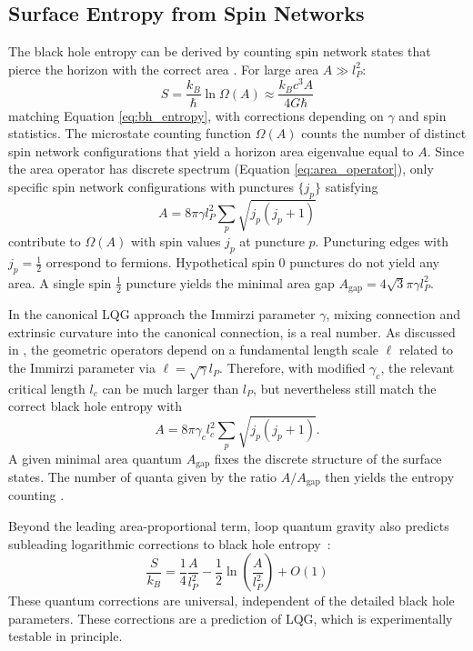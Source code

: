 \documentclass[11pt,a4paper]{article}
\theoremstyle{definition}
\begin{document}
	
	\subsection{Surface Entropy from Spin Networks}
	
	The black hole entropy can be derived by counting spin network states that pierce the horizon with the correct area \cite{rovelli1996,ashtekar1997}. For large area $A \gg l_P^2$:
	\begin{equation}
		S = \frac{k_B}{\hbar} \ln \Omega(A) \approx \frac{k_B c^3 A}{4G\hbar}
		\label{eq:lqg_entropy}
	\end{equation}
	matching Equation \eqref{eq:bh_entropy}, with corrections depending on $\gamma$ and spin statistics.
	The microstate counting function $\Omega(A)$ counts the number of distinct spin network configurations that yield a horizon area eigenvalue equal to $A$. Since the area operator has discrete spectrum (Equation \eqref{eq:area_operator}), only specific spin network configurations with punctures $\{j_p\}$ satisfying
	\begin{equation}
		A = 8\pi \gamma l_P^2 \sum_{p} \sqrt{j_p(j_p+1)}
	\end{equation}
	contribute to $\Omega(A)$ with spin values $j_p$ at puncture $p$.
	Puncturing edges with $j_p=\frac{1}{2}$ orrespond to fermions.
	Hypothetical spin $0$ punctures do not yield any area. 
	A single spin $\frac{1}{2}$  puncture yields the minimal area gap 
	$A_{\text{gap}}=4\sqrt{3}\pi \gamma l_P^2 $.   
	
	In the canonical LQG approach the Immirzi parameter $\gamma$, mixing connection and extrinsic curvature into the canonical connection, is a real number. As discussed in \cite{rainer1999length}, the geometric operators depend on a fundamental length scale $\ell$ related to the Immirzi parameter via $\ell = \sqrt{\gamma} l_P$. Therefore, with modified $\gamma_c$, the relevant critical length $l_c$ can be much larger than $l_P$, but nevertheless
	still match the correct black hole entropy with
	\begin{equation}
		A = 8\pi \gamma_c l_c^2 \sum_{p} \sqrt{j_p(j_p+1)} .
		\label{eq:area_discrete}
	\end{equation}
	A given minimal area quantum
	$A_{\text{gap}}$
	fixes the discrete structure of the surface states. The number of quanta given by the ratio $A/A_{\text{gap}}$ then yields the entropy counting \cite{rainer1999length}.
	
	Beyond the leading area-proportional term, loop quantum gravity also predicts subleading logarithmic corrections to black hole entropy~\cite{meissner2004}:
	\begin{equation}
		\frac{S}{k_B} = \frac{1}{4}\frac{A}{ l_P^2} - \frac{1}{2} \ln\left(\frac{A}{l_P^2}\right) + O(1)
	\end{equation}
	These quantum corrections are universal, independent of the detailed black hole parameters.
	These corrections are a prediction of LQG, which is experimentally testable in principle. 
	
\end{document}
